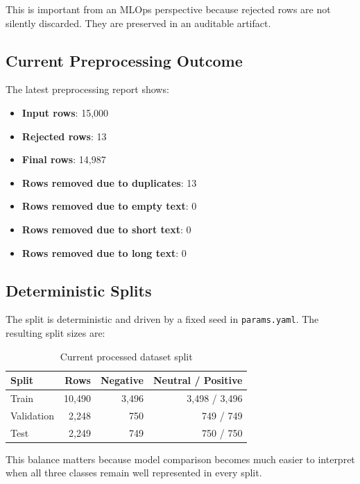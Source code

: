 \documentclass[11pt,a4paper]{article}
\newcommand{\smallmetric}[2]{\textbf{#1}: #2}
\begin{document}
This is important from an MLOps perspective because rejected rows are not silently discarded. They are preserved in an auditable artifact.

\subsection{Current Preprocessing Outcome}

The latest preprocessing report shows:

\begin{itemize}[leftmargin=1.4em]
  \item \smallmetric{Input rows}{15{,}000}
  \item \smallmetric{Rejected rows}{13}
  \item \smallmetric{Final rows}{14{,}987}
  \item \smallmetric{Rows removed due to duplicates}{13}
  \item \smallmetric{Rows removed due to empty text}{0}
  \item \smallmetric{Rows removed due to short text}{0}
  \item \smallmetric{Rows removed due to long text}{0}
\end{itemize}

\subsection{Deterministic Splits}

The split is deterministic and driven by a fixed seed in \texttt{params.yaml}. The resulting split sizes are:

\begin{table}[H]
  \centering
  \caption{Current processed dataset split}
  \begin{tabular}{lrrr}
    \toprule
    \textbf{Split} & \textbf{Rows} & \textbf{Negative} & \textbf{Neutral / Positive} \\
    \midrule
    Train & 10{,}490 & 3{,}496 & 3{,}498 / 3{,}496 \\
    Validation & 2{,}248 & 750 & 749 / 749 \\
    Test & 2{,}249 & 749 & 750 / 750 \\
    \bottomrule
  \end{tabular}
\end{table}

This balance matters because model comparison becomes much easier to interpret when all three classes remain well represented in every split.
\end{document}
